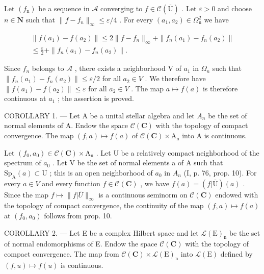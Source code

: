Let \((f_{\mathrm{n}})\) be a sequence in \(\mathcal{A}\) converging to \(f \in \mathcal{C}(\overline{\mathrm{U}})\) . Let \(\varepsilon > 0\) and choose \(n \in \mathbf{N}\) such that \(\|f - f_{n}\|_{\infty} \leqslant \varepsilon/4\) . For every \((a_{1}, a_{2}) \in \Omega_{\mathrm{n}}^{2}\) we have

\[
\begin{array}{c} \| f (a _ {1}) - f (a _ {2}) \| \leqslant 2 \| f - f _ {n} \| _ {\infty} + \| f _ {n} (a _ {1}) - f _ {n} (a _ {2}) \| \\ \leqslant \frac {\varepsilon}{2} + \| f _ {n} (a _ {1}) - f _ {n} (a _ {2}) \|. \end{array}
\]

Since \(f_n\) belongs to \(\mathcal{A}\) , there exists a neighborhood V of \(a_1\) in \(\Omega_n\) such that \(\| f_n(a_1) - f_n(a_2) \| \leqslant \varepsilon / 2\) for all \(a_2 \in V\) . We therefore have \(\| f(a_1) - f(a_2) \| \leqslant \varepsilon\) for all \(a_2 \in V\) . The map \(a \mapsto f(a)\) is therefore continuous at \(a_1\) ; the assertion is proved.

COROLLARY 1. --- Let A be a unital stellar algebra and let \(A_{n}\) be the set of normal elements of A. Endow the space \(\mathcal{C}(\mathbf{C})\) with the topology of compact convergence. The map \((f,a)\mapsto f(a)\) of \(\mathcal{C}(\mathbf{C})\times\mathrm{A}_{\mathrm{n}}\) into A is continuous.

Let \((f_{0}, a_{0}) \in \mathcal{C}(\mathbf{C}) \times \mathrm{A}_{\mathrm{n}}\) . Let U be a relatively compact neighborhood of the spectrum of \(a_{0}\) . Let V be the set of normal elements a of A such that \(\mathrm{Sp}_{\mathrm{A}}(a) \subset \mathrm{U}\) ; this is an open neighborhood of \(a_{0}\) in \(A_{n}\) (I, p. 76, prop. 10). For every \(a \in V\) and every function \(f \in \mathcal{C}(\mathbf{C})\) , we have \(f(a) = (f|\overline{\mathrm{U}})(a)\) . Since the map \(f \mapsto \|f|\overline{U}\|_{\infty}\) is a continuous seminorm on \(\mathcal{C}(\mathbf{C})\) endowed with the topology of compact convergence, the continuity of the map \((f, a) \mapsto f(a)\) at \((f_{0}, a_{0})\) follows from prop. 10.

COROLLARY 2. --- Let E be a complex Hilbert space and let \(\mathcal{L}(\mathrm{E})_{\mathrm{n}}\) be the set of normal endomorphisms of E. Endow the space \(\mathcal{C}(\mathbf{C})\) with the topology of compact convergence. The map from \(\mathcal{C}(\mathbf{C}) \times \mathcal{L}(\mathrm{E})_{\mathrm{n}}\) into \(\mathcal{L}(\mathrm{E})\) defined by \((f, u) \mapsto f(u)\) is continuous.

